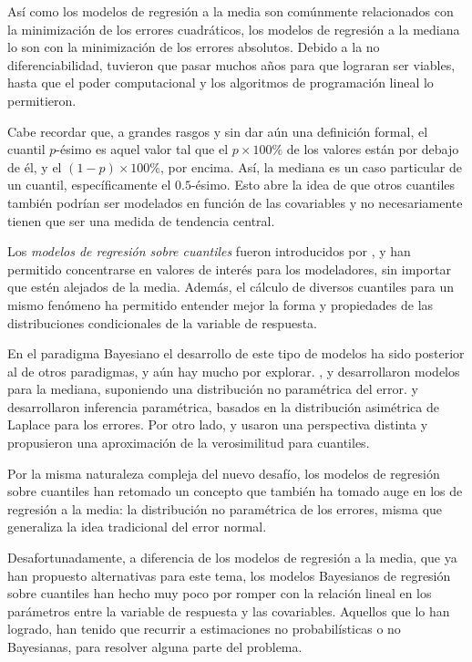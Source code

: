As\'i como los modelos de regresi\'on a la media son com\'unmente relacionados con la minimizaci\'on de los errores cuadr\'aticos, los modelos de regresi\'on a la mediana lo son con la minimizaci\'on de los errores absolutos. Debido a la no diferenciabilidad, tuvieron que pasar muchos años para que lograran ser viables, hasta que el poder computacional y los algoritmos de programaci\'on lineal lo permitieron.

Cabe recordar que, a grandes rasgos y sin dar a\'un una definici\'on formal, el cuantil $p$-\'esimo es aquel valor tal que el $p \times 100\%$ de los valores est\'an por debajo de \'el, y el $(1-p)\times 100\%$, por encima. As\'i, la mediana es un caso particular de un cuantil, espec\'ificamente el $0.5$-\'esimo. Esto abre la idea de que otros cuantiles tambi\'en podr\'ian ser modelados en funci\'on de las covariables y no necesariamente tienen que ser una medida de tendencia central. 

Los \textit{modelos de regresi\'on sobre cuantiles} fueron introducidos por \cite{Koenker_QuantReg}, y han permitido concentrarse en valores de inter\'es para los modeladores, sin importar que est\'en alejados de la media. Adem\'as, el c\'alculo de diversos cuantiles para un mismo fen\'omeno ha permitido entender mejor la forma y propiedades de las distribuciones condicionales de la variable de respuesta.

En el paradigma Bayesiano el desarrollo de este tipo de modelos ha sido posterior al de otros paradigmas, y a\'un hay mucho por explorar. \cite{Walker_BayesAccFail}, \cite{Kottas_BaySemiparamMed} y \cite{Hanson_PolyaTrees} desarrollaron modelos para la mediana, suponiendo una distribuci\'on no param\'etrica del error. \cite{Yu_BayQuantReg} y \cite{Tsionas_BayQuantInf} desarrollaron inferencia param\'etrica, basados en la distribuci\'on asim\'etrica de Laplace para los errores. Por otro lado, \cite{Lavine_LikeQuant} y \cite{Dunson_ApproxBayes} usaron una perspectiva distinta y propusieron una aproximaci\'on de la verosimilitud para cuantiles.

Por la misma naturaleza compleja del nuevo desaf\'io, los modelos de regresi\'on sobre cuantiles han retomado un concepto que tambi\'en ha tomado auge en los de regresi\'on a la media: la distribuci\'on no param\'etrica de los errores, misma que generaliza la idea tradicional del error normal. 

Desafortunadamente, a diferencia de los modelos de regresi\'on a la media, que ya han propuesto alternativas para este tema, los modelos Bayesianos de regresi\'on sobre cuantiles han hecho muy poco por romper con la relaci\'on lineal en los par\'ametros entre la variable de respuesta y las covariables. Aquellos que lo han logrado, han tenido que recurrir a estimaciones no probabil\'isticas o no Bayesianas, para resolver alguna parte del problema.


